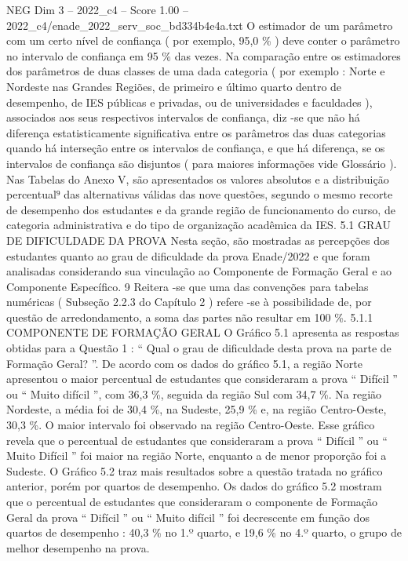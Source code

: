 \begin{textsample}{NEG Dim 3 – 2022\_c4 – Score 1.00 – 2022\_c4/enade\_2022\_serv\_soc\_bd334b4e4a.txt}
O estimador de um parâmetro com um certo nível de confiança ( por exemplo, 95,0 \% ) deve conter o parâmetro no intervalo de confiança em 95 \% das vezes.
Na comparação entre os estimadores dos parâmetros de duas classes de uma dada categoria ( por exemplo : Norte e Nordeste nas Grandes Regiões, de primeiro e último quarto dentro de desempenho, de IES públicas e privadas, ou de universidades e faculdades ), associados aos seus respectivos intervalos de confiança, diz -se que não há diferença estatisticamente significativa entre os parâmetros das duas categorias quando há interseção entre os intervalos de confiança, e que há diferença, se os intervalos de confiança são disjuntos ( para maiores informações vide Glossário ).
Nas Tabelas do Anexo V, são apresentados os valores absolutos e a distribuição percentual⁹ das alternativas válidas das nove questões, segundo o mesmo recorte de desempenho dos estudantes e da grande região de funcionamento do curso, de categoria administrativa e do tipo de organização acadêmica da IES. 5.1 GRAU DE DIFICULDADE DA PROVA Nesta seção, são mostradas as percepções dos estudantes quanto ao grau de dificuldade da prova Enade/2022 e que foram analisadas considerando sua vinculação ao Componente de Formação Geral e ao Componente Específico. 9 Reitera -se que uma das convenções para tabelas numéricas ( Subseção 2.2.3 do Capítulo 2 ) refere -se à possibilidade de, por questão de arredondamento, a soma das partes não resultar em 100 \%. 5.1.1 COMPONENTE DE FORMAÇÃO GERAL O Gráfico 5.1 apresenta as respostas obtidas para a Questão 1 : “ Qual o grau de dificuldade desta prova na parte de Formação Geral? ”.
De acordo com os dados do gráfico 5.1, a região Norte apresentou o maior percentual de estudantes que consideraram a prova “ Difícil ” ou “ Muito difícil ”, com 36,3 \%, seguida da região Sul com 34,7 \%.
Na região Nordeste, a média foi de 30,4 \%, na Sudeste, 25,9 \% e, na região Centro-Oeste, 30,3 \%.
O maior intervalo foi observado na região Centro-Oeste.
Esse gráfico revela que o percentual de estudantes que consideraram a prova “ Difícil ” ou “ Muito Difícil ” foi maior na região Norte, enquanto a de menor proporção foi a Sudeste.
O Gráfico 5.2 traz mais resultados sobre a questão tratada no gráfico anterior, porém por quartos de desempenho.
Os dados do gráfico 5.2 mostram que o percentual de estudantes que consideraram o componente de Formação Geral da prova “ Difícil ” ou “ Muito difícil ” foi decrescente em função dos quartos de desempenho : 40,3 \% no 1.º quarto, e 19,6 \% no 4.º quarto, o grupo de melhor desempenho na prova.

\end{textsample}
